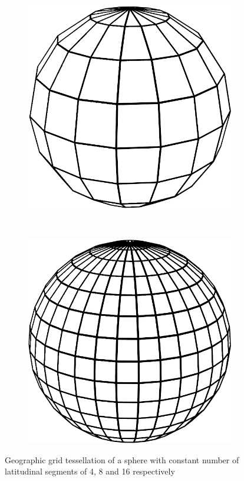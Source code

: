 \begin{figure}
\begin{subfigure}[b]{0.2\textwidth}
        \includegraphics[width=\textwidth]{figures/tessellation/tessellation_geo2.png}
    \end{subfigure}
    ~ %
    \begin{subfigure}[b]{0.2\textwidth}
        \includegraphics[width=\textwidth]{figures/tessellation/tessellation_geo3.png}
    \end{subfigure}
    \caption{Geographic grid tessellation of a sphere with constant number of latitudinal segments of 4, 8 and 16 respectively}
    \label{fig:tessellation_geo}
\end{figure}

